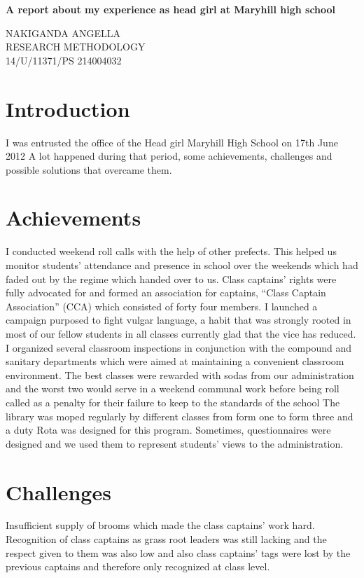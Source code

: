 \documentclass[12]{article}
\begin{document}
\begin{titlepage}
\begin{center}
\huge{\bfseries A report about my experience as head girl at Maryhill high school}\\
\end{center}
\begin{flushright}
\textsc{\large NAKIGANDA ANGELLA\\
RESEARCH METHODOLOGY\\
14/U/11371/PS
214004032
}
\end{flushright}
\end{titlepage}
\section{Introduction}
I was entrusted the office of the Head girl Maryhill High School on 17th June 2012
 A lot happened during that period, some achievements, challenges and possible solutions that overcame them.
\section{Achievements}
I conducted weekend roll calls with the help of other prefects. This helped us monitor students’ attendance and presence in school over the weekends which had faded out by the regime which handed over to us.
Class captains’ rights were fully advocated for and formed an association for captains, “Class Captain Association” (CCA) which consisted of forty four members.
I launched a campaign purposed to fight vulgar language, a habit that was strongly rooted in most of our fellow students in all classes currently glad that the vice has reduced.
I organized several classroom inspections in conjunction with the compound and sanitary departments which were aimed at maintaining a convenient classroom environment. The best classes were rewarded with sodas from our administration and the worst two would serve in a weekend communal work before being roll called as a penalty for their failure to keep to the standards of the school
The library was moped regularly by different classes from form one to form three and a duty Rota was designed for this program.
Sometimes, questionnaires were designed and we used them to represent students’ views to the administration.
\section{Challenges}

Insufficient supply of brooms which made the class captains’ work hard.
Recognition of class captains as grass root leaders was still lacking and the respect given to them was also low and also class captains’ tags were lost by the previous captains and therefore only recognized at class level.
\end{document}
